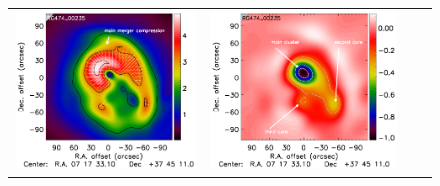 \documentclass[traditabstract]{aa}
\begin{document}
\begin{figure}[h]
{\begin{tabular}{llll}
\includegraphics[trim=2.3cm 0.7cm 0.0cm 0cm, clip=true, scale=1]{Figure/Grad_RG474_00235_Ymap_zobs0p4_regrid_15_15_45.pdf} & 
\includegraphics[trim=2.3cm 0.7cm 0.0cm 0cm, clip=true, scale=1]{Figure/DoG_RG474_00235_Ymap_zobs0p4_regrid_15_15_45.pdf} \\
\end{tabular}}

\end{figure}
\end{document}
